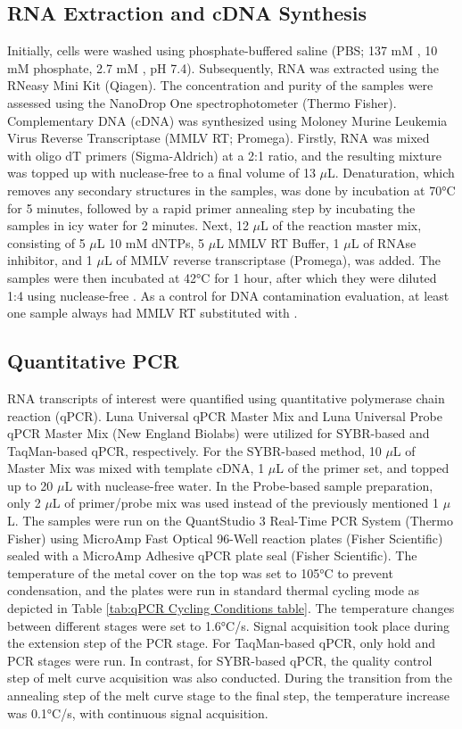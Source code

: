 \subsection{RNA Extraction and cDNA Synthesis} \label{subsec:RNA Extraction and cDNA Synthesis}
Initially, cells were washed using phosphate-buffered saline (PBS; 137 mM , 10 mM phosphate, 2.7 mM , pH 7.4). Subsequently, RNA was extracted using the RNeasy Mini Kit (Qiagen). The concentration and purity of the samples were assessed using the NanoDrop One spectrophotometer (Thermo Fisher). Complementary DNA (cDNA) was synthesized using Moloney Murine Leukemia Virus Reverse Transcriptase (MMLV RT; Promega). Firstly, RNA was mixed with oligo dT primers (Sigma-Aldrich) at a 2:1 ratio, and the resulting mixture was topped up with nuclease-free  to a final volume of 13 \(\mu\)L. Denaturation, which removes any secondary structures in the samples, was done by incubation at 70°C for 5 minutes, followed by a rapid primer annealing step by incubating the samples in icy water for 2 minutes. Next, 12 \(\mu\)L of the reaction master mix, consisting of 5 \(\mu\)L 10 mM dNTPs, 5 \(\mu\)L MMLV RT Buffer, 1 \(\mu\)L of RNAse inhibitor, and 1 \(\mu\)L of MMLV reverse transcriptase (Promega), was added. The samples were then incubated at 42°C for 1 hour, after which they were diluted 1:4 using nuclease-free . As a control for DNA contamination evaluation, at least one sample always had MMLV RT substituted with .

\subsection{Quantitative PCR} \label{subsec:Quantitative PCR}
RNA transcripts of interest were quantified using quantitative polymerase chain reaction (qPCR). Luna Universal qPCR Master Mix and Luna Universal Probe qPCR Master Mix (New England Biolabs) were utilized for SYBR-based and TaqMan-based qPCR, respectively. For the SYBR-based method, 10 \(\mu\)L of Master Mix was mixed with template cDNA, 1 \(\mu\)L of the primer set, and topped up to 20 \(\mu\)L with nuclease-free water. In the Probe-based sample preparation, only 2 \(\mu\)L of primer/probe mix was used instead of the previously mentioned 1 \(\mu\)L. The samples were run on the QuantStudio 3 Real-Time PCR System (Thermo Fisher) using MicroAmp Fast Optical 96-Well reaction plates (Fisher Scientific) sealed with a MicroAmp Adhesive qPCR plate seal (Fisher Scientific). The temperature of the metal cover on the top was set to 105°C to prevent condensation, and the plates were run in standard thermal cycling mode as depicted in Table \ref{tab:qPCR Cycling Conditions table}. The temperature changes between different stages were set to 1.6°C/s. Signal acquisition took place during the extension step of the PCR stage. For TaqMan-based qPCR, only hold and PCR stages were run. In contrast, for SYBR-based qPCR, the quality control step of melt curve acquisition was also conducted. During the transition from the annealing step of the melt curve stage to the final step, the temperature increase was 0.1°C/s, with continuous signal acquisition.

